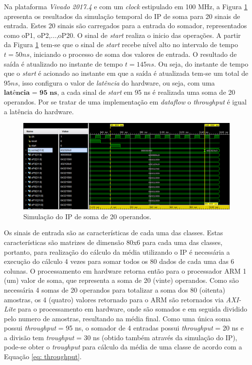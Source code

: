 Na plataforma \textit{Vivado 2017.4} e com um \textit{clock} estipulado em 100 MHz, a Figura \ref{simulacao_sum} apresenta os resultados da simulação temporal do IP de soma para 20 sinais de entrada. Estes 20 sinais são carregados para a entrada do somador, representados como oP1, oP2,...,oP20. O sinal de \textit{start} realiza o inicio das operações. A partir da Figura \ref{simulacao_sum} tem-se que o sinal de \textit{start} recebe nível alto no intervalo de tempo $t = 50 ns$, iniciando o processo de soma dos valores de entrada. O resultado de saída é atualizado no instante de tempo $t = 145 ns$. Ou seja, do instante de tempo que o \textit{start} é acionado ao instante em que a saída é atualizada tem-se um total de $95 ns$, isso configura o valor de \textit{latência} do hardware, ou seja, com uma $\textbf{latência = 95 ns}$, a cada sinal de \textit{start} em 95 ns é realizada uma soma de 20 operandos. Por se tratar de uma implementação em \textit{dataflow} o \textit{throughput} é igual a latência do hardware.

\begin{figure}[!h]
	\centering
	\includegraphics[keepaspectratio=true,scale=0.5]{figuras/Simulacao_somatorio.PNG}
	\caption{Simulação do IP de soma de 20 operandos.}
	\label{simulacao_sum}
\end{figure} 


Os sinais de entrada são as características de cada uma das classes. Estas características são matrizes de dimensão 80x6 para cada uma das classes, portanto, para realização do cálculo da média utilizando o IP é necessária a execução do cálculo 4 vezes para somar todos os 80 dados de cada uma das 6 colunas. O processamento em hardware retorna então para o processador ARM 1 (um) valor de soma, que representa a soma de 20 (vinte) operandos. Como são necessária 4 somas de 20 operandos para totalizar a soma dos 80 (oitenta) amostras, os 4 (quatro) valores retornado para o ARM são retornados via \textit{AXI-Lite} para o processamento em hardware, onde são somados e em seguida dividido pelo numero de amostras, resultando na média final. Como uma única soma possui \textit{throughput} = 95 ns, o somador de 4 entradas possui \textit{throughput} = 20 ns e a divisão tem \textit{troughput} = 30 ns (obtido também através da simulação do IP), pode-se obter o \textit{troughput} para cálculo da média de uma classe de acordo com a Equação \ref{eq: throughput}.

